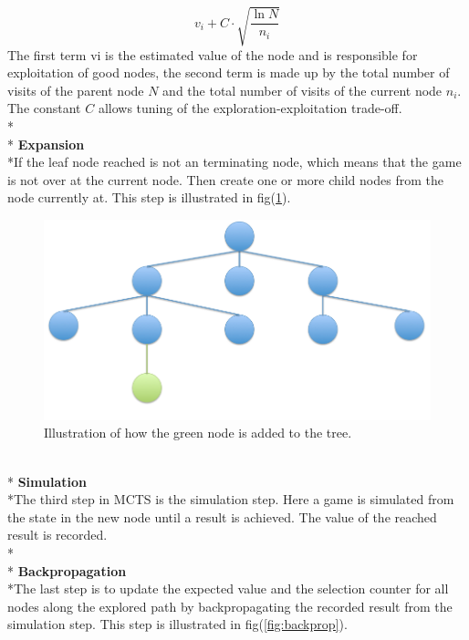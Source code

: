 \documentclass[journal]{vgtc}                %
\begin{document}
\begin{equation} \label{eq:upperconfidence}
	v_{i} + C \cdot \sqrt{\frac{\ln N}{n_{i}}}
\end{equation}
The first term vi is the estimated value of the node and is responsible for exploitation of good nodes, the second term is made up by the total number of visits of the parent node $N$ and the total number of visits of the current node $n_{i}$. The constant $C$ allows tuning of the exploration-exploitation trade-off. 
\\*\\*
\textbf{Expansion}
\\*If the leaf node reached is not an terminating node, which means that the game is not over at the current node. Then create one or more child nodes from the node currently at. This step is illustrated in fig(\ref{fig:expansion}).
\begin{figure}[here]
  \begin{center}
    \includegraphics[scale=0.30]{img/tree1.png}
    \caption{\label{fig:expansion} Illustration of how the green node is added to the tree.}
  \end{center}
\end{figure}
\\*
\textbf{Simulation}
\\*The third step in MCTS is the simulation step. Here a game is simulated from the state in the new node until a result is achieved. The value of the reached result is recorded.
\\*\\*
\textbf{Backpropagation}
\\*The last step is to update the expected value and the selection counter for all nodes along the explored path by backpropagating the recorded result from the simulation step. This step is illustrated in fig(\ref{fig:backprop}).
\end{document}
